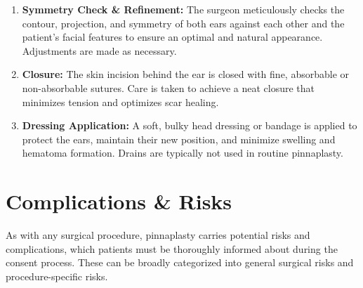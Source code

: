 \begin{enumerate}
\begin{itemize}
      \item \textit{Suture Techniques (e.g., Furnas):} Permanent sutures are placed from the conchal cartilage to the mastoid fascia (the tough tissue covering the bone behind the ear) to pull the concha closer to the head, effectively reducing its prominence.
    \end{itemize}
  \item \textbf{Symmetry Check \& Refinement:} The surgeon meticulously checks the contour, projection, and symmetry of both ears against each other and the patient's facial features to ensure an optimal and natural appearance. Adjustments are made as necessary.
  \item \textbf{Closure:} The skin incision behind the ear is closed with fine, absorbable or non-absorbable sutures. Care is taken to achieve a neat closure that minimizes tension and optimizes scar healing.
  \item \textbf{Dressing Application:} A soft, bulky head dressing or bandage is applied to protect the ears, maintain their new position, and minimize swelling and hematoma formation. Drains are typically not used in routine pinnaplasty.
\end{enumerate}

\section*{Complications \& Risks}
As with any surgical procedure, pinnaplasty carries potential risks and complications, which patients must be thoroughly informed about during the consent process. These can be broadly categorized into general surgical risks and procedure-specific risks.

